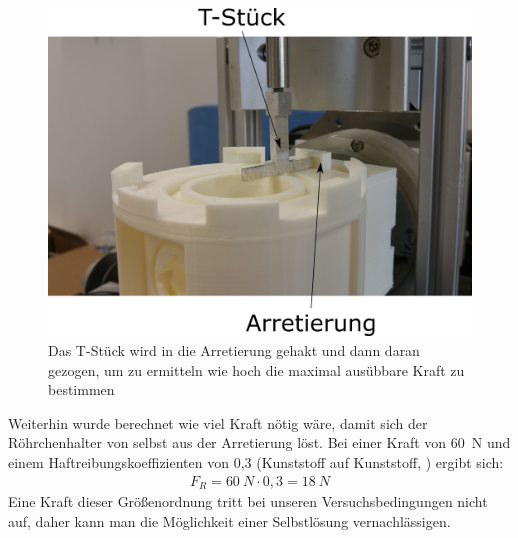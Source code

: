 \begin{figure}[h]
	\begin{center}
		\includegraphics[scale=0.6]{Messmethode_Zugkraft.png}
		\caption[Messaufbau Arretierung 2]{Das T-Stück wird in die Arretierung gehakt und dann daran gezogen, um zu ermitteln wie hoch die maximal ausübbare Kraft zu bestimmen}
	\end{center}
\end{figure}

Weiterhin wurde berechnet wie viel Kraft nötig wäre, damit sich der Röhrchenhalter von selbst aus der Arretierung löst. Bei einer Kraft von \SI{60}{N} und einem Haftreibungskoeffizienten von 0,3 (Kunststoff auf Kunststoff, \cite{Schumann2011}) ergibt sich:
\begin{align*}
F_R = \SI{60}{N} \cdot 0,3 = \SI{18}{N}
\end{align*}
Eine Kraft dieser Größenordnung tritt bei unseren Versuchsbedingungen nicht auf, daher kann man die Möglichkeit einer Selbstlösung vernachlässigen.

